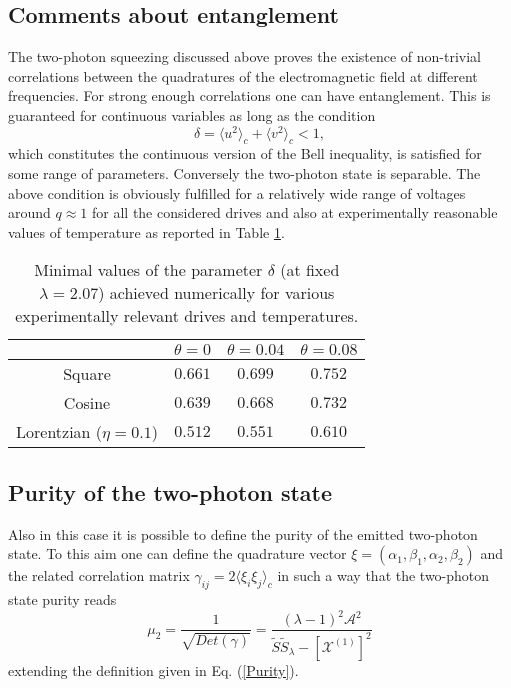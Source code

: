 \documentclass[twocolumn,showpacs,preprintnumbers,amsmath,amssymb%
 aps,
 prb,
 lengthcheck,%
]{revtex4-1}
\def\be{\begin{equation}}
\def\ee{\end{equation}}
\begin{document}
\subsection{Comments about entanglement}
The two-photon squeezing discussed above proves the existence of non-trivial correlations between the quadratures of the electromagnetic field at different frequencies. For strong enough correlations one can have entanglement. This is guaranteed for continuous variables as long as the condition 
\be
\delta= \langle u^{2} \rangle_{c}+ \langle v^{2} \rangle_{c} <1, 
\ee
which constitutes the continuous version of the Bell inequality\cite{duan_inseparability_2000}, is satisfied for some range of parameters. Conversely the two-photon state is separable. The above condition is obviously fulfilled for a relatively wide range of voltages around $q\approx 1$ for all the considered drives and also at experimentally reasonable values of temperature as reported in Table \ref{tab2}. 
\begin{table}
\begin{center}
  \begin{tabular}{ | c | c | c | c | }
    \hline
     & $\theta=0$ & $\theta=0.04$ & $\theta=0.08$ \\ \hline
    Square  & $0.661$  & $0.699$  & $0.752$  \\ \hline 
      Cosine  & $0.639$ & $0.668$ & $0.732$  \\ \hline 
     Lorentzian ($\eta=0.1$) & $0.512$ & $0.551$ & $0.610$  \\ \hline      
         \end{tabular}
\end{center}
\caption{Minimal values of the parameter $\delta$ (at fixed $\lambda=2.07$) achieved numerically for various experimentally relevant drives and temperatures.}
    \label{tab2}
\end{table}

\subsection{Purity of the two-photon state}
Also in this case it is possible to define the purity of the emitted two-photon state. To this aim one can define the quadrature vector  \cite{braunstein_quantum_2016} $\xi= (\alpha_{1}, \beta_{1}, \alpha_{2}, \beta_{2})$
and the related correlation matrix $\gamma_{ij}=2 \langle \xi_{i} \xi_{j} \rangle_{c}$ in such a way that the two-photon state purity reads
\be
\mu_{2}= \frac{1}{\sqrt{Det (\gamma)}}=\frac{(\lambda-1)^{2}\mathcal{A}^{2}}{\tilde{S} \tilde{S}_{\lambda}-\left[\mathcal{X}^{(1)} \right]^{2}}
\ee
extending the definition given in Eq. (\ref{Purity}).
\end{document}
